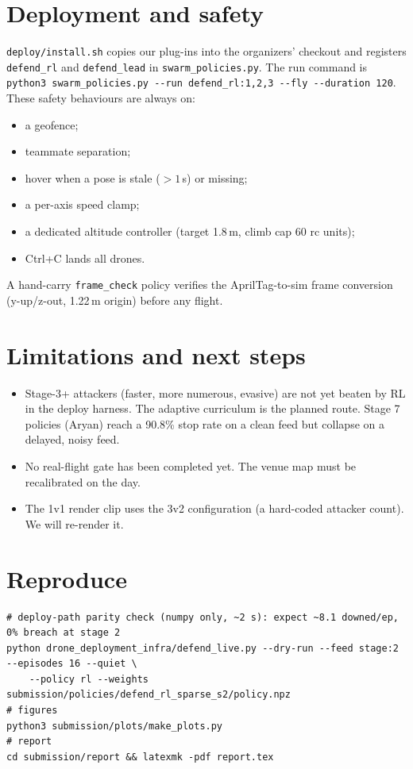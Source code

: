 \documentclass[10pt,a4paper]{article}
\begin{document}
\section{Deployment and safety}
\texttt{deploy/install.sh} copies our plug-ins into the organizers' checkout and registers \texttt{defend\_rl} and
\texttt{defend\_lead} in \texttt{swarm\_policies.py}. The run command is
\texttt{python3 swarm\_policies.py -{}-run defend\_rl:1,2,3 -{}-fly -{}-duration 120}.
These safety behaviours are always on:
\begin{itemize}
\item a geofence;
\item teammate separation;
\item hover when a pose is stale ($>1$\,s) or missing;
\item a per-axis speed clamp;
\item a dedicated altitude controller (target 1.8\,m, climb cap 60 rc units);
\item Ctrl+C lands all drones.
\end{itemize}
A hand-carry \texttt{frame\_check} policy verifies the AprilTag-to-sim frame conversion
(y-up/z-out, 1.22\,m origin) before any flight.

\section{Limitations and next steps}
\begin{itemize}
\item Stage-3+ attackers (faster, more numerous, evasive) are not yet beaten by RL in the deploy harness. The adaptive
curriculum is the planned route. Stage 7 policies (Aryan) reach a 90.8\% stop rate on a clean feed but collapse
on a delayed, noisy feed.
\item No real-flight gate has been completed yet. The venue map must be recalibrated on the day.
\item The 1v1 render clip uses the 3v2 configuration (a hard-coded attacker count). We will re-render it.
\end{itemize}

\section*{Reproduce}
\small
\begin{verbatim}
# deploy-path parity check (numpy only, ~2 s): expect ~8.1 downed/ep, 0% breach at stage 2
python drone_deployment_infra/defend_live.py --dry-run --feed stage:2 --episodes 16 --quiet \
    --policy rl --weights submission/policies/defend_rl_sparse_s2/policy.npz
# figures
python3 submission/plots/make_plots.py
# report
cd submission/report && latexmk -pdf report.tex
\end{verbatim}
\end{document}
